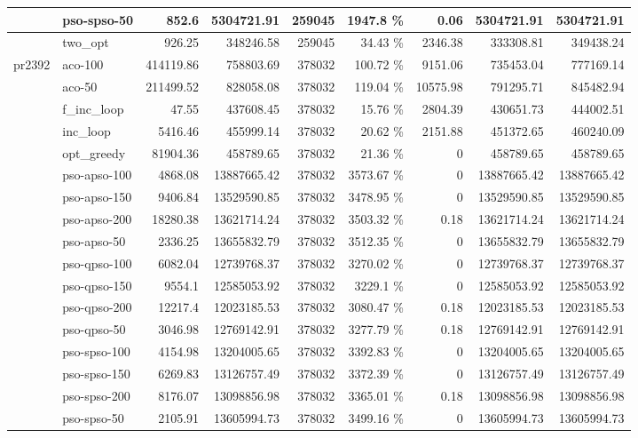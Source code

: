 \documentclass[conference]{IEEEtran}
\begin{document}
\begin{center}
\begin{longtable}[ht]{|l|l|r|r|r|r|r|r|r|}
 & pso-spso-50 & 852.6 & 5304721.91 & 259045 & 1947.8 \% & 0.06 & 5304721.91 & 5304721.91 \\ \hline
 & two\_opt & 926.25 & 348246.58 & 259045 & 34.43 \% & 2346.38 & 333308.81 & 349438.24 \\ \hline
pr2392 & aco-100 & 414119.86 & 758803.69 & 378032 & 100.72 \% & 9151.06 & 735453.04 & 777169.14 \\ \hline
 & aco-50 & 211499.52 & 828058.08 & 378032 & 119.04 \% & 10575.98 & 791295.71 & 845482.94 \\ \hline
 & f\_inc\_loop & 47.55 & 437608.45 & 378032 & 15.76 \% & 2804.39 & 430651.73 & 444002.51 \\ \hline
 & inc\_loop & 5416.46 & 455999.14 & 378032 & 20.62 \% & 2151.88 & 451372.65 & 460240.09 \\ \hline
 & opt\_greedy & 81904.36 & 458789.65 & 378032 & 21.36 \% & 0 & 458789.65 & 458789.65 \\ \hline
 & pso-apso-100 & 4868.08 & 13887665.42 & 378032 & 3573.67 \% & 0 & 13887665.42 & 13887665.42 \\ \hline
 & pso-apso-150 & 9406.84 & 13529590.85 & 378032 & 3478.95 \% & 0 & 13529590.85 & 13529590.85 \\ \hline
 & pso-apso-200 & 18280.38 & 13621714.24 & 378032 & 3503.32 \% & 0.18 & 13621714.24 & 13621714.24 \\ \hline
 & pso-apso-50 & 2336.25 & 13655832.79 & 378032 & 3512.35 \% & 0 & 13655832.79 & 13655832.79 \\ \hline
 & pso-qpso-100 & 6082.04 & 12739768.37 & 378032 & 3270.02 \% & 0 & 12739768.37 & 12739768.37 \\ \hline
 & pso-qpso-150 & 9554.1 & 12585053.92 & 378032 & 3229.1 \% & 0 & 12585053.92 & 12585053.92 \\ \hline
 & pso-qpso-200 & 12217.4 & 12023185.53 & 378032 & 3080.47 \% & 0.18 & 12023185.53 & 12023185.53 \\ \hline
 & pso-qpso-50 & 3046.98 & 12769142.91 & 378032 & 3277.79 \% & 0.18 & 12769142.91 & 12769142.91 \\ \hline
 & pso-spso-100 & 4154.98 & 13204005.65 & 378032 & 3392.83 \% & 0 & 13204005.65 & 13204005.65 \\ \hline
 & pso-spso-150 & 6269.83 & 13126757.49 & 378032 & 3372.39 \% & 0 & 13126757.49 & 13126757.49 \\ \hline
 & pso-spso-200 & 8176.07 & 13098856.98 & 378032 & 3365.01 \% & 0.18 & 13098856.98 & 13098856.98 \\ \hline
 & pso-spso-50 & 2105.91 & 13605994.73 & 378032 & 3499.16 \% & 0 & 13605994.73 & 13605994.73 \\ \hline

\end{longtable}
\end{center}
\end{document}
